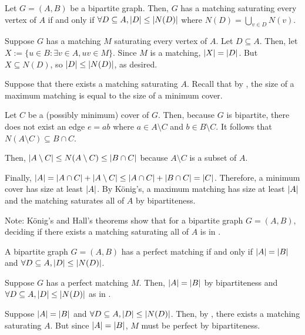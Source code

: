\documentclass[class=math239,notes,tikz]{agony}
\begin{document}
\begin{theorem}\label{thm:hall}
  Let $G = (A,B)$ be a bipartite graph.
  Then, $G$ has a matching saturating every vertex of $A$
  if and only if $\forall D \subseteq A, \abs{D} \leq \abs{N(D)}$
  where $N(D) = \bigcup\limits_{v \in D} N(v)$.
\end{theorem}
\begin{prf}
  Suppose $G$ has a matching $M$ saturating every vertex of $A$.
  Let $D \subseteq A$.
  Then, let $X := \{u \in B : \exists v \in A, uv \in M\}$.
  Since $M$ is a matching, $\abs{X} = \abs{D}$.
  But $X \subseteq N(D)$, so $\abs{D} \leq \abs{N(D)}$, as desired.

  Suppose that there exists a matching saturating $A$.
  Recall that by , the size of a maximum matching
  is equal to the size of a minimum cover.

  Let $C$ be a (possibly minimum) cover of $G$.
  Then, because $G$ is bipartite, there does not exist an edge $e = ab$
  where $a \in A \setminus C$ and $b \in B \setminus C$.
  It follows that $N(A \setminus C) \subseteq B \cap C$.

  Then, $\abs{A \setminus C} \leq N(A \setminus C) \leq \abs{B \cap C}$
  because $A \setminus C$ is a subset of $A$.

  Finally, $\abs{A} = \abs{A \cap C} + \abs{A \setminus C}
    \leq \abs{A \cap C} + \abs{B \cap C} = \abs{C}$.
  Therefore, a minimum cover has size at least $\abs{A}$.
  By K\"onig's, a maximum matching has size at least $\abs{A}$
  and the matching saturates all of $A$ by bipartiteness.
\end{prf}

Note: K\"onig's and Hall's theorems show that for a bipartite graph $G = (A,B)$,
deciding if there exists a matching saturating all of $A$ is in \coNP.

\begin{corollary}[8.6.1]\label{cor:bip.pm}
  A bipartite graph $G = (A,B)$ has a perfect matching
  if and only if $\abs{A} = \abs{B}$ and $\forall D \subseteq A, \abs{D} \leq \abs{N(D)}$.
\end{corollary}
\begin{prf}
  Suppose $G$ has a perfect matching $M$.
  Then, $\abs{A} = \abs{B}$ by bipartiteness
  and $\forall D \subseteq A, \abs{D} \leq \abs{N(D)}$ as in .

  Suppose $\abs{A} = \abs{B}$ and $\forall D \subseteq A, \abs{D} \leq \abs{N(D)}$.
  Then, by , there exists a matching saturating $A$.
  But since $\abs{A} = \abs{B}$, $M$ must be perfect by bipartiteness.
\end{prf}
\end{document}
